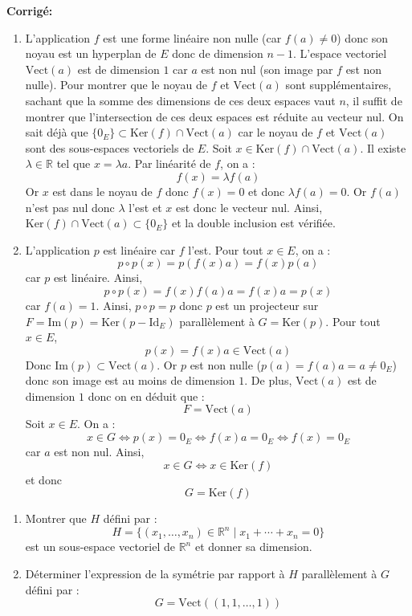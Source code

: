 \documentclass[a4paper,twoside,french,11pt]{VcCours}
\newcommand{\corr}{\textbf{Corrigé:}}
\begin{document}
\corr 

\begin{enumerate}
\item L'application $f$ est une forme linéaire non nulle (car $f(a) \neq 0$) donc son noyau est un hyperplan de $E$ donc de dimension $n-1$. L'espace vectoriel $\textrm{Vect}(a)$ est de dimension $1$ car $a$ est non nul (son image par $f$ est non nulle). Pour montrer que le noyau de $f$ et $\textrm{Vect}(a)$ sont supplémentaires, sachant que la somme des dimensions de ces deux espaces vaut $n$, il suffit de montrer que l'intersection de ces deux espaces est réduite au vecteur nul. On sait déjà que $\lbrace 0_E \rbrace \subset \textrm{Ker}(f) \cap \textrm{Vect}(a)$ car le noyau de $f$ et $\textrm{Vect}(a)$ sont des sous-espaces vectoriels de $E$. Soit $x \in \textrm{Ker}(f) \cap \textrm{Vect}(a)$. Il existe $\lambda \in \mathbb{R}$ tel que $x= \lambda a$. Par linéarité de $f$, on a :
$$ f(x) = \lambda f(a)$$
Or $x$ est dans le noyau de $f$ donc $f(x) = 0$ et donc $\lambda f(a) = 0$. Or $f(a)$ n'est pas nul donc $\lambda$ l'est et $x$ est donc le vecteur nul. Ainsi, $\textrm{Ker}(f) \cap \textrm{Vect}(a) \subset \lbrace 0_E \rbrace$ et la double inclusion est vérifiée.
\item L'application $p$ est linéaire car $f$ l'est. Pour tout $x \in E$, on a :
$$ p \circ p (x) = p(f(x) a) = f(x) p(a)$$
car $p$ est linéaire. Ainsi,
$$ p \circ p (x) = f(x) f(a) a = f(x) a = p(x)$$
car $f(a)=1$. Ainsi, $p \circ p=p$ donc $p$ est un projecteur sur $F= \textrm{Im}(p)= \textrm{Ker}(p- \textrm{Id}_E)$ parallèlement à $G = \textrm{Ker}(p)$. Pour tout $x \in E$,
$$ p(x) = f(x) a \in \textrm{Vect}(a)$$
Donc $\textrm{Im}(p) \subset \textrm{Vect}(a)$. Or $p$ est non nulle ($p(a)=f(a) a= a \neq 0_E$) donc son image est au moins de dimension $1$. De plus, $\textrm{Vect}(a)$ est de dimension $1$ donc on en déduit que :
$$ F = \textrm{Vect}(a)$$
Soit $x \in E$. On a :
$$ x \in G \Longleftrightarrow p(x) = 0_E \Longleftrightarrow f(x) a = 0_E \Longleftrightarrow f(x) = 0_E$$
car $a$ est non nul. Ainsi,
$$ x \in G \Longleftrightarrow x \in \textrm{Ker}(f)$$
et donc 
$$ G = \textrm{Ker}(f)$$
\end{enumerate}





\begin{Exercice}{} 
\begin{enumerate}
\item Montrer que $H$ défini par :
$$ H = \lbrace (x_1, \ldots, x_n)\in \mathbb{R}^n \; \vert \;    x_1 + \cdots + x_n = 0 \rbrace$$
est un sous-espace vectoriel de $\mathbb{R}^n$ et donner sa dimension.
\item Déterminer l'expression de la symétrie par rapport à $H$ parallèlement à $G$ défini par :
$$ G = \textrm{Vect}((1,1, \ldots, 1))$$
\end{enumerate}
\end{Exercice}
\end{document}
